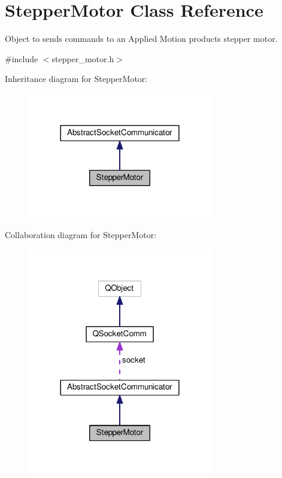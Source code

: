 \hypertarget{class_stepper_motor}{}\section{Stepper\+Motor Class Reference}
\label{class_stepper_motor}


Object to sends commands to an Applied Motion products stepper motor.  




{\ttfamily \#include $<$stepper\+\_\+motor.\+h$>$}



Inheritance diagram for Stepper\+Motor\+:
\nopagebreak
\begin{figure}[H]
\begin{center}
\leavevmode
\includegraphics[width=228pt]{class_stepper_motor__inherit__graph}
\end{center}
\end{figure}


Collaboration diagram for Stepper\+Motor\+:
\nopagebreak
\begin{figure}[H]
\begin{center}
\leavevmode
\includegraphics[width=228pt]{class_stepper_motor__coll__graph}
\end{center}
\end{figure}
